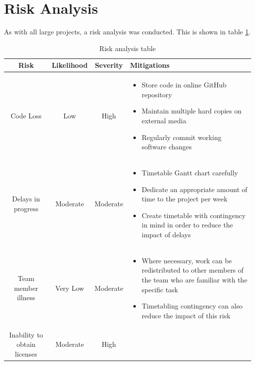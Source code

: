 \documentclass[12pt,a4paper]{report}
\begin{document}
\section{Risk Analysis}
    As with all large projects, a risk analysis was conducted. This is shown in table \ref{tab:risk}.
    \begin{table}[h]
        \centering
        \caption{Risk analysis table}
        \label{tab:risk}
        \begin{tabularx}{\textwidth}{|c|c|c| X |}
            \hline 
            \textbf{Risk} & \textbf{Likelihood} & \textbf{Severity} & \textbf{Mitigations} \\ 
            \hline \hline
            Code Loss & Low & High &
            \begin{itemize}[leftmargin=*]
                \item Store code in online GitHub repository
                \item Maintain multiple hard copies on external media
                \item Regularly commit working software changes
            \end{itemize}
            \\ 
            \hline 
            Delays in progress & Moderate & Moderate &
            \begin{itemize}[leftmargin=*]
                \item Timetable Gantt chart carefully
                \item Dedicate an appropriate amount of time to the project per week
                \item Create timetable with contingency in mind in order to reduce the impact of delays
            \end{itemize}        
            \\ 
            \hline 
            Team member illness & Very Low & Moderate &
            \begin{itemize}[leftmargin=*]
                \item Where necessary, work can be redistributed to other members of the team who are familiar with the specific task
                \item Timetabling contingency can also reduce the impact of this risk
            \end{itemize}        
            \\ 
            \hline 
            Inability to obtain licenses & Moderate & High &
            \begin{itemize}[leftmargin=*]

\end{itemize}
\end{tabularx}
\end{table}
\end{document}
